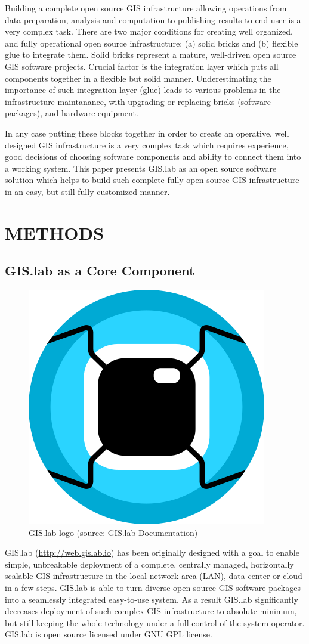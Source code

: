 \documentclass{isprs}
\begin{document}
Building a complete open source GIS infrastructure allowing operations
from data preparation, analysis and computation to publishing results
to end-user is a very complex task. There are two major conditions for
creating well organized, and fully operational open source
infrastructure: (a) solid bricks and (b) flexible glue to integrate
them. Solid bricks represent a mature, well-driven open source GIS
software projects. Crucial factor is the integration layer which puts all components
together in a flexible but solid manner. Underestimating the
importance of such integration layer (glue) leads to various problems in the 
infrastructure maintanance, with upgrading or replacing bricks (software packages), and
hardware equipment.

In any case putting these blocks together in order to create an operative, well
designed GIS infrastructure is a very complex task which requires
experience, good decisions of choosing software components and ability
to connect them into a working system. This paper presents GIS.lab as
an open source software solution which helps to build such complete fully
open source GIS infrastructure in an easy, but still fully customized
manner.

\section{METHODS}

\subsection{GIS.lab as a Core Component}

\begin{figure}[ht!]
\begin{center}
  \includegraphics[width=.15\columnwidth]{figures/gislab-logo.png}
  \caption{GIS.lab logo (source: GIS.lab Documentation)}
\label{fig:gislab_logo}
\end{center}
\end{figure}

GIS.lab (\url{http://web.gislab.io}) has been originally designed with
a goal to enable simple, unbreakable deployment of a complete,
centrally managed, horizontally scalable GIS infrastructure in the
local network area (LAN), data center or cloud in a few steps. GIS.lab
is able to turn diverse open source GIS software packages into a
seamlessly integrated easy-to-use system. As a result GIS.lab
significantly decreases deployment of such complex GIS infrastructure
to absolute minimum, but still keeping the whole technology under a
full control of the system operator. GIS.lab is open
source licensed under GNU GPL license.
\end{document}
